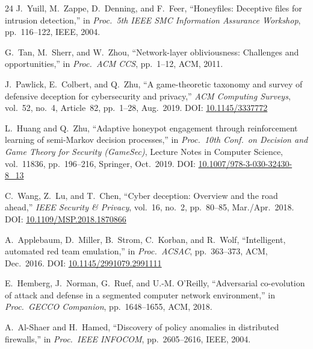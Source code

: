 \documentclass[journal]{IEEEtran}
\begin{document}
\begin{thebibliography}{24}
J.~Yuill, M.~Zappe, D.~Denning, and F.~Feer,
``Honeyfiles: Deceptive files for intrusion detection,''
in \textit{Proc.\ 5th IEEE SMC Information Assurance
Workshop}, pp.~116--122, IEEE, 2004.

G.~Tan, M.~Sherr, and W.~Zhou,
``Network-layer obliviousness: Challenges and
opportunities,'' in \textit{Proc.\ ACM CCS},
pp.~1--12, ACM, 2011.

J.~Pawlick, E.~Colbert, and Q.~Zhu,
``A game-theoretic taxonomy and survey of defensive
deception for cybersecurity and privacy,''
\textit{ACM Computing Surveys}, vol.~52, no.~4,
Article~82, pp.~1--28, Aug.~2019.
DOI: \href{https://doi.org/10.1145/3337772}{10.1145/3337772}


L.~Huang and Q.~Zhu,
``Adaptive honeypot engagement through reinforcement
learning of semi-Markov decision processes,''
in \textit{Proc.\ 10th Conf.\ on Decision and Game Theory
for Security (GameSec)}, Lecture Notes in Computer
Science, vol.~11836, pp.~196--216, Springer, Oct.~2019.
DOI: \href{https://doi.org/10.1007/978-3-030-32430-8_13}
{10.1007/978-3-030-32430-8\_13}


C.~Wang, Z.~Lu, and T.~Chen,
``Cyber deception: Overview and the road ahead,''
\textit{IEEE Security \& Privacy}, vol.~16, no.~2,
pp.~80--85, Mar./Apr.~2018.
DOI: \href{https://doi.org/10.1109/MSP.2018.1870866}
{10.1109/MSP.2018.1870866}


A.~Applebaum, D.~Miller, B.~Strom, C.~Korban, and R.~Wolf,
``Intelligent, automated red team emulation,''
in \textit{Proc.\ ACSAC}, pp.~363--373, ACM, Dec.~2016.
DOI: \href{https://doi.org/10.1145/2991079.2991111}
{10.1145/2991079.2991111}

E.~Hemberg, J.~Norman, G.~Ruef, and U.-M. O'Reilly,
``Adversarial co-evolution of attack and defense in a
segmented computer network environment,''
in \textit{Proc.\ GECCO Companion},
pp.~1648--1655, ACM, 2018.


A.~Al-Shaer and H.~Hamed,
``Discovery of policy anomalies in distributed firewalls,''
in \textit{Proc.\ IEEE INFOCOM}, pp.~2605--2616, IEEE, 2004.


\end{thebibliography}
\end{document}
